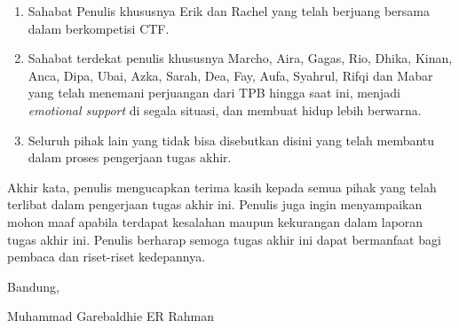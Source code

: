 \begin{enumerate}
  \item Sahabat Penulis khususnya Erik dan Rachel yang telah berjuang bersama dalam berkompetisi CTF.
  \item Sahabat terdekat penulis khususnya Marcho, Aira, Gagas, Rio, Dhika, Kinan, Anca, Dipa, Ubai, Azka, Sarah, Dea, Fay, Aufa, Syahrul, Rifqi dan Mabar yang telah menemani perjuangan dari TPB hingga saat ini, menjadi \textit{emotional support} di segala situasi, dan membuat hidup lebih berwarna.
  \item Seluruh pihak lain yang tidak bisa disebutkan disini yang telah membantu dalam proses pengerjaan tugas akhir.
\end{enumerate}

Akhir kata, penulis mengucapkan terima kasih kepada semua pihak yang telah terlibat dalam pengerjaan tugas akhir ini. Penulis juga ingin menyampaikan mohon maaf apabila terdapat kesalahan maupun kekurangan dalam laporan tugas akhir ini. Penulis berharap semoga tugas akhir ini dapat bermanfaat bagi pembaca dan riset-riset kedepannya.

\begin{flushright}
  \vspace{0.5cm}
  Bandung, \tanggalpengesahan
  
  
  \vspace{1.5cm}
  
  Muhammad Garebaldhie ER Rahman
\end{flushright}